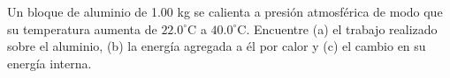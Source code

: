 \item Un bloque de aluminio de 1.00 kg se calienta a presión atmosférica de modo que su temperatura aumenta de $22.0^\circ\text{C}$ a $40.0^\circ\text{C}$. Encuentre (a) el trabajo realizado sobre el aluminio, (b) la energía agregada a él por calor y (c) el cambio en su energía interna.
